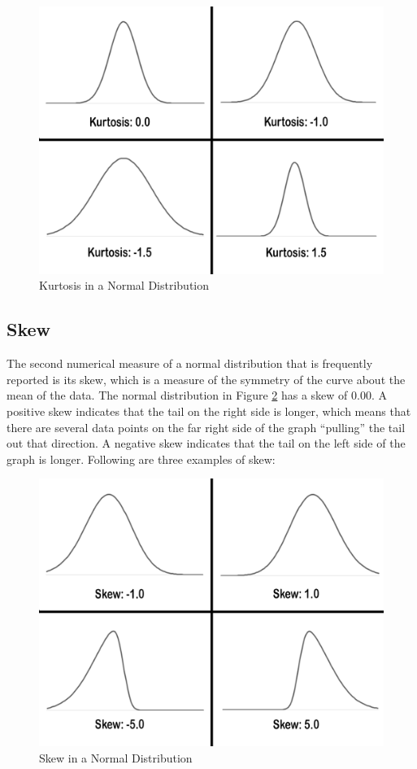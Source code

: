 \begin{figure}[H]
	\centering
	\includegraphics[width=\maxwidth{.95\linewidth}]{gfx/06-Kurtosis}
	\caption{Kurtosis in a Normal Distribution}
	\label{fig06.02}
\end{figure}

\subsection{Skew}
The second numerical measure of a normal distribution that is frequently reported is its \gls{skew}, which is a measure of the symmetry of the curve about the mean of the data. The normal distribution in Figure \ref{fig06.03} has a skew of $ 0.00 $. A positive skew indicates that the tail on the right side is longer, which means that there are several data points on the far right side of the graph ``pulling'' the tail out that direction. A negative skew indicates that the tail on the left side of the graph is longer. Following are three examples of skew:

\begin{figure}[H]
	\centering
	\includegraphics[width=\maxwidth{.95\linewidth}]{gfx/06-Skew}
	\caption{Skew in a Normal Distribution}
	\label{fig06.03}
\end{figure}


